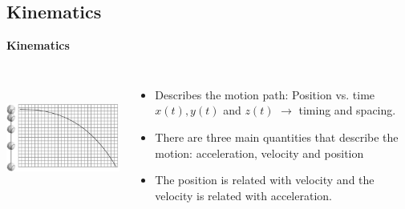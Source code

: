 \documentclass[]{beamer}
\begin{document}


  \subsection{Kinematics}


  \begin{frame}
    
  \textbf{Kinematics}
  
  \begin{columns}[c]
     \column{2.5in}  %
    
     \begin{center}
      \includegraphics[height=1.6in]{images/motion_path.jpg}
    \end{center}
  
  
     \column{2in}
  


  \begin{itemize}
   \item Describes the motion path: Position vs. time $x(t), y(t)$ and $z(t)$ $\rightarrow$ timing and spacing. \pause
   
   \item There are three main quantities that describe the motion: \textcolor{mypink1}{acceleration}, \textcolor{mypink1}{velocity}
   and \textcolor{mypink1}{position}\pause
   
   \item The position is related with velocity and the velocity is related with acceleration. 
   \end{itemize}
  
   

  
     \end{columns}
  
  
  
   \end{frame}
  
  
  
\end{document}
